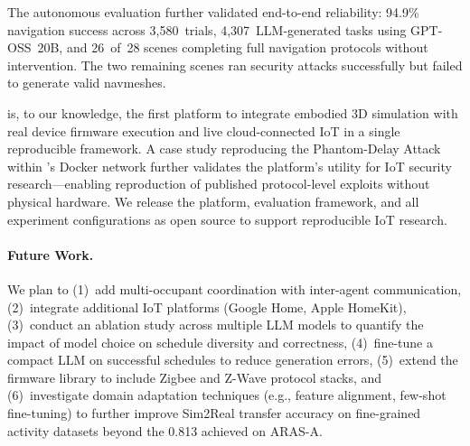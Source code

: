 The autonomous evaluation further validated end-to-end reliability:
94.9\% navigation success across 3{,}580~trials,
4{,}307~LLM-generated tasks using GPT-OSS~20B, and
26~of~28 scenes completing full navigation protocols without
intervention.  The two remaining scenes ran security attacks
successfully but failed to generate valid navmeshes.

\sys{} is, to our knowledge, the first platform to integrate embodied
3D simulation with real device firmware execution and live
cloud-connected IoT in a single reproducible framework.  A case study reproducing
the Phantom-Delay Attack~\cite{phantom-delay} within \sys{}'s
Docker network further validates the platform's utility for
IoT security research---enabling reproduction of published
protocol-level exploits without physical hardware.
We release the platform,
evaluation framework, and all experiment configurations as open
source to support reproducible IoT research.

\paragraph{Future Work.}
We plan to (1)~add multi-occupant coordination with inter-agent
communication, (2)~integrate additional IoT platforms (Google Home,
Apple HomeKit), (3)~conduct an ablation study across multiple LLM
models to quantify the impact of model choice on schedule diversity
and correctness, (4)~fine-tune a compact LLM on successful \sys{}
schedules to reduce generation errors, (5)~extend the firmware
library to include Zigbee and Z-Wave protocol stacks, and
(6)~investigate domain adaptation techniques (e.g., feature alignment,
few-shot fine-tuning) to further improve Sim2Real transfer accuracy
on fine-grained activity datasets beyond the 0.813 achieved on
ARAS-A.
